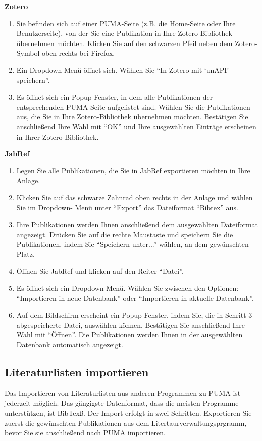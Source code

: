 \textbf{Zotero}
\begin{enumerate}
    \item Sie befinden sich auf einer PUMA-Seite (z.B. die Home-Seite oder Ihre Benutzerseite), von der Sie eine Publikation in Ihre Zotero-Bibliothek übernehmen möchten. Klicken Sie auf den schwarzen Pfeil neben dem Zotero-Symbol oben rechts bei Firefox.
    \item Ein Dropdown-Menü öffnet sich. Wählen Sie \enquote{In Zotero mit \enquote{unAPI} speichern}.
    \item Es öffnet sich ein Popup-Fenster, in dem alle Publikationen der entsprechenden PUMA-Seite aufgelistet sind. Wählen Sie die Publikationen aus, die Sie in Ihre Zotero-Bibliothek übernehmen möchten. Bestätigen Sie anschließend Ihre Wahl mit \enquote{OK} und Ihre ausgewählten Einträge erscheinen in Ihrer Zotero-Bibliothek.
\end{enumerate} 
\textbf{JabRef}
\begin{enumerate}
    \item Legen Sie alle Publikationen, die Sie in JabRef exportieren möchten in Ihre Anlage.
    \item Klicken Sie auf das schwarze Zahnrad oben rechts in der Anlage und wählen Sie im Dropdown- Menü unter \enquote{Export} das Dateiformat \enquote{Bibtex} aus.
    \item Ihre Publikationen werden Ihnen anschließend dem ausgewählten Dateiformat angezeigt. Drücken Sie auf die rechte Maustaste und speichern Sie die Publikationen, indem Sie \enquote{Speichern unter...} wählen, an dem gewünschten Platz. 
    \item Öffnen Sie JabRef und klicken auf den Reiter \enquote{Datei}. 
    \item Es öffnet sich ein Dropdown-Menü. Wählen Sie zwischen den Optionen: \enquote{Importieren in neue Datenbank} oder \enquote{Importieren in aktuelle Datenbank}.
    \item Auf dem Bildschirm erscheint ein Popup-Fenster, indem Sie, die in Schritt 3 abgespeicherte Datei, auswählen können. Bestätigen Sie anschließend Ihre Wahl mit \enquote{Öffnen}. Die Publikationen werden Ihnen in der ausgewählten Datenbank automatisch angezeigt.
\end{enumerate}

\subsection{Literaturlisten importieren}
Das Importieren von Literaturlisten aus anderen Programmen zu PUMA ist jederzeit möglich. Das gängigste Datenformat, dass die meisten Programme unterstützen, ist BibTexß. \newline 
Der Import erfolgt in zwei Schritten. Exportieren Sie zuerst die gewünschten Publikationen aus dem Litertaurverwaltungsprgramm, bevor Sie sie anschließend nach PUMA importieren. 

